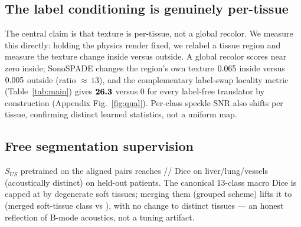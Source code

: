\documentclass[runningheads]{llncs}
\begin{document}
\subsection{The label conditioning is genuinely per-tissue}
\label{sec:pertissue}
The central claim is that texture is per-tissue, not a global recolor. We measure this directly:
holding the physics render fixed, we relabel a tissue region and measure the texture change inside
versus outside. A global recolor scores near zero inside; SonoSPADE changes the region's own texture
$0.065$ inside versus $0.005$ outside (ratio ${\approx}\,13$), and the complementary label-swap
locality metric (Table~\ref{tab:main}) gives $\textbf{26.3}$ versus $0$ for every label-free translator by
construction (Appendix Fig.~\ref{fig:qual}). Per-class speckle SNR also shifts per tissue, confirming
distinct learned statistics, not a uniform map.

\subsection{Free segmentation supervision}
$S_{US}$ pretrained on the aligned pairs reaches \liverDice{}/\lungDice{}/\vesselDice{} Dice on
liver/lung/vessels (acoustically distinct) on held-out patients. The canonical 13-class macro Dice is
capped at \diceCanon{} by degenerate soft tissues; merging them (grouped scheme) lifts it to \diceGroup{}
(merged soft-tissue class \softGroup{} vs \softCanon{}), with no change to distinct tissues --- an honest
reflection of B-mode acoustics, not a tuning artifact.
\end{document}
